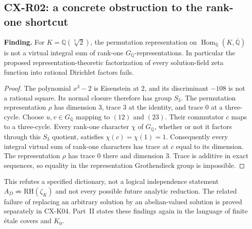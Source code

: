 \subsection{CX-R02: a concrete obstruction to the rank-one shortcut}
\label{finding:R02}

\textbf{Finding.} For $K=\mathbb Q(\sqrt[3]{2})$, the permutation
representation on $\operatorname{Hom}_{\mathbb Q}(K,\overline{\mathbb Q})$
is not a virtual integral sum of rank-one $G_{\mathbb Q}$-representations.
In particular the proposed representation-theoretic factorization of every
solution-field zeta function into rational Dirichlet factors fails.

\begin{proof}
The polynomial $x^3-2$ is Eisenstein at $2$, and its discriminant $-108$ is
not a rational square.  Its normal closure therefore has group $S_3$.
The permutation representation $\rho$ has dimension $3$, trace $3$ at the
identity, and trace $0$ at a three-cycle.  Choose $u,v\in G_{\mathbb Q}$
mapping to $(12)$ and $(23)$.  Their commutator $c$ maps to a three-cycle.
Every rank-one character $\chi$ of $G_{\mathbb Q}$, whether or not it
factors through this $S_3$ quotient, satisfies $\chi(c)=\chi(1)=1$.
Consequently every integral virtual sum of rank-one characters has trace
at $c$ equal to its dimension.  The representation $\rho$ has trace $0$
there and dimension $3$.  Trace is additive in exact sequences, so equality
in the representation Grothendieck group is impossible.
\end{proof}

This refutes a specified dictionary, not a logical independence statement
$A_D\nRightarrow\mathrm{RH}(\zeta_K)$ and not every possible future analytic
reduction.  The related failure of replacing an arbitrary solution by an
abelian-valued solution is proved separately in CX-K04.  Part~II states
these findings again in the language of finite étale covers and $K_0$.

